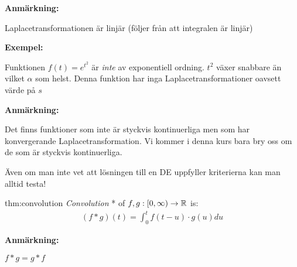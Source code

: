 \par\bigskip
\noindent\textbf{Anmärkning:}\par
\noindent Laplacetransformationen är linjär (följer från att integralen är linjär)
\par\bigskip
\noindent\textbf{Exempel:}\par
\noindent Funktionen $f(t) = e^{t^2}$ är \textit{inte} av exponentiell ordning. $t^2$ växer snabbare än vilket $\alpha$ som helst. Denna funktion har inga Laplacetransformationer oavsett värde på $s$ 
\par\bigskip
\noindent\textbf{Anmärkning:}\par
\noindent Det finns funktioner som inte är styckvis kontinuerliga men som har konvergerande Laplacetransformation. Vi kommer i denna kurs bara bry oss om de som är styckvis kontinuerliga.
\par\bigskip
\noindent Även om man inte vet att lösningen till en DE uppfyller kriterierna kan man alltid testa! 
\par\bigskip
\begin{theo}[Convolution]{thm:convolution}
  \textit{Convolution} * of $f,g:[0,\infty)\to\mathbb{R}$ is:
  \begin{equation*}
    \begin{gathered}
      (f*g)(t) = \int_{0}^{t}f(t-u)\cdot g(u)du
    \end{gathered}
  \end{equation*}
\end{theo}
\par\bigskip
\noindent\textbf{Anmärkning:}\par
\noindent $f*g = g*f$
\newpage
